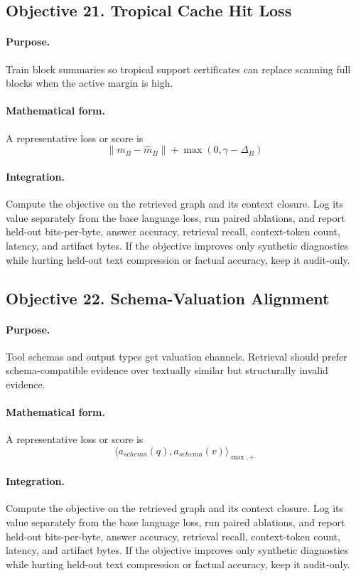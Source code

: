 \documentclass[11pt]{article}
\theoremstyle{definition}
\theoremstyle{remark}
\begin{document}
\subsection{Objective 21. Tropical Cache Hit Loss}
\paragraph{Purpose.} Train block summaries so tropical support certificates can replace scanning full blocks when the active margin is high.

\paragraph{Mathematical form.} A representative loss or score is
\[
    \|m_B-\hat m_B\|+\max(0,\gamma-\Delta_B)
\]

\paragraph{Integration.} Compute the objective on the retrieved graph and its context closure. Log its value separately from the base language loss, run paired ablations, and report held-out bits-per-byte, answer accuracy, retrieval recall, context-token count, latency, and artifact bytes. If the objective improves only synthetic diagnostics while hurting held-out text compression or factual accuracy, keep it audit-only.


\subsection{Objective 22. Schema-Valuation Alignment}
\paragraph{Purpose.} Tool schemas and output types get valuation channels. Retrieval should prefer schema-compatible evidence over textually similar but structurally invalid evidence.

\paragraph{Mathematical form.} A representative loss or score is
\[
    \langle a_{schema}(q),a_{schema}(v)\rangle_{\max,+}
\]

\paragraph{Integration.} Compute the objective on the retrieved graph and its context closure. Log its value separately from the base language loss, run paired ablations, and report held-out bits-per-byte, answer accuracy, retrieval recall, context-token count, latency, and artifact bytes. If the objective improves only synthetic diagnostics while hurting held-out text compression or factual accuracy, keep it audit-only.
\end{document}
